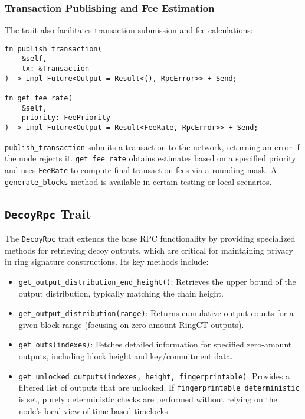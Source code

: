 \documentclass[12pt,a4paper]{article}
\begin{document}
\subsubsection{Transaction Publishing and Fee Estimation}
\label{sec:monero-rpc-tx-publishing}

The trait also facilitates transaction submission and fee calculations:

\begin{verbatim}
fn publish_transaction(
    &self,
    tx: &Transaction
) -> impl Future<Output = Result<(), RpcError>> + Send;

fn get_fee_rate(
    &self,
    priority: FeePriority
) -> impl Future<Output = Result<FeeRate, RpcError>> + Send;
\end{verbatim}

\texttt{publish\_transaction} submits a transaction to the network, returning an error if the node
rejects it. \texttt{get\_fee\_rate} obtains estimates based on a specified priority and uses
\texttt{FeeRate} to compute final transaction fees via a rounding mask. A \texttt{generate\_blocks}
method is available in certain testing or local scenarios.

\subsection{\texttt{DecoyRpc} Trait}
\label{sec:monero-rpc-decoy-rpc}

The \texttt{DecoyRpc} trait extends the base RPC functionality by providing specialized methods for
retrieving decoy outputs, which are critical for maintaining privacy in ring signature
constructions. Its key methods include:

\begin{itemize}
    \item \texttt{get\_output\_distribution\_end\_height()}: Retrieves the upper bound of the output
    distribution, typically matching the chain height.
    \item \texttt{get\_output\_distribution(range)}: Returns cumulative output counts for a given
    block range (focusing on zero-amount RingCT outputs).
    \item \texttt{get\_outs(indexes)}: Fetches detailed information for specified zero-amount
    outputs, including block height and key/commitment data.
    \item \texttt{get\_unlocked\_outputs(indexes, height, fingerprintable)}: Provides a filtered list
    of outputs that are unlocked. If \texttt{fingerprintable\_deterministic} is set, purely
    deterministic checks are performed without relying on the node’s local view of time-based
    timelocks.
\end{itemize}
\end{document}
